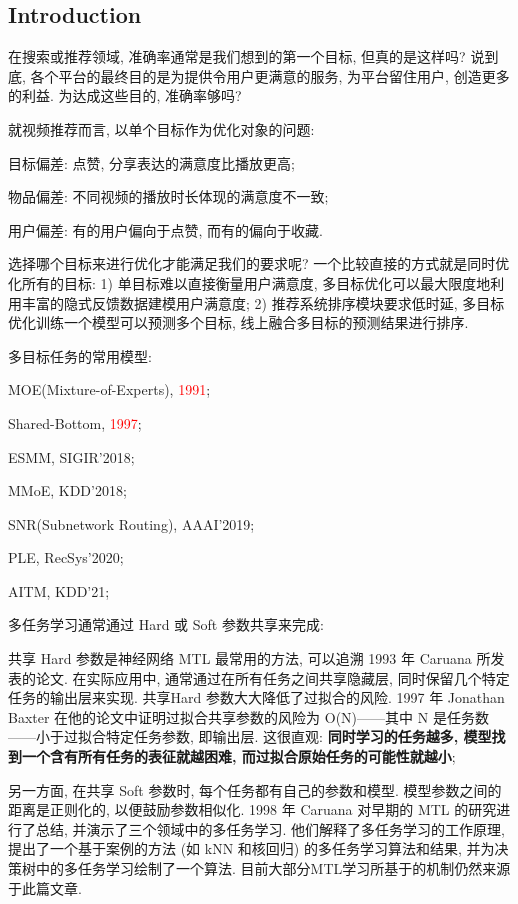 \subsection{Introduction}
在搜索或推荐领域, 准确率通常是我们想到的第一个目标, 但真的是这样吗? 说到底, 各个平台的最终目的是为提供令用户更满意的服务, 为平台留住用户, 创造更多的利益. 为达成这些目的, 准确率够吗?

就视频推荐而言, 以单个目标作为优化对象的问题:
\begin{myitemize}
	\item 目标偏差: 点赞, 分享表达的满意度比播放更高;
	
	\item 物品偏差: 不同视频的播放时长体现的满意度不一致;
	
	\item 用户偏差: 有的用户偏向于点赞, 而有的偏向于收藏.
\end{myitemize}

选择哪个目标来进行优化才能满足我们的要求呢? 一个比较直接的方式就是同时优化所有的目标: 1) 单目标难以直接衡量用户满意度, 多目标优化可以最大限度地利用丰富的隐式反馈数据建模用户满意度; 2) 推荐系统排序模块要求低时延, 多目标优化训练一个模型可以预测多个目标, 线上融合多目标的预测结果进行排序.


多目标任务的常用模型: 
\begin{myitemize}
	\item MOE(Mixture-of-Experts), \textcolor{red}{1991};
	\item Shared-Bottom, \textcolor{red}{1997};
	\item ESMM, SIGIR'2018;
	\item MMoE, KDD'2018;
	\item SNR(Subnetwork Routing), AAAI'2019;
	\item PLE, RecSys'2020;
	\item AITM, KDD'21;
\end{myitemize}

多任务学习通常通过 Hard 或 Soft 参数共享来完成: 
\begin{myitemize}
	\item 共享 Hard 参数是神经网络 MTL 最常用的方法, 可以追溯 1993 年 Caruana 所发表的论文. 在实际应用中, 通常通过在所有任务之间共享隐藏层, 同时保留几个特定任务的输出层来实现. 共享Hard 参数大大降低了过拟合的风险. 1997 年 Jonathan Baxter 在他的论文中证明过拟合共享参数的风险为 O(N)——其中 N 是任务数——小于过拟合特定任务参数, 即输出层. 这很直观: \textbf{同时学习的任务越多, 模型找到一个含有所有任务的表征就越困难, 而过拟合原始任务的可能性就越小};
	
	\item 另一方面, 在共享 Soft 参数时, 每个任务都有自己的参数和模型. 模型参数之间的距离是正则化的, 以便鼓励参数相似化. 1998 年 Caruana 对早期的 MTL 的研究进行了总结, 并演示了三个领域中的多任务学习. 他们解释了多任务学习的工作原理, 提出了一个基于案例的方法 (如 kNN 和核回归) 的多任务学习算法和结果, 并为决策树中的多任务学习绘制了一个算法. 目前大部分MTL学习所基于的机制仍然来源于此篇文章.
\end{myitemize}
 

